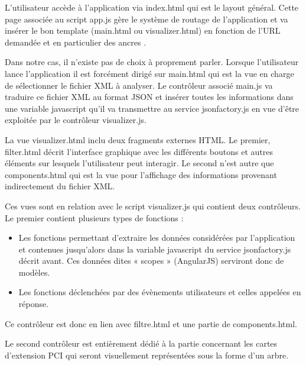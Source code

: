\documentclass [a4paper,11pt]{article}
\begin{document}
L’utilisateur accède à l’application via index.html qui est le layout général. Cette page associée au script app.js gère le système de routage de l’application et va insérer le bon template (main.html ou visualizer.html) en fonction de l’URL demandée et en particulier des ancres \cite{Landazuri16}.
\newline

Dans notre cas, il n’existe pas de choix à proprement parler. Lorsque l’utilisateur lance l’application il est forcément dirigé sur main.html qui est la vue en charge de sélectionner le fichier XML à analyser. Le contrôleur associé main.js va traduire ce fichier XML au format JSON et insérer toutes les informations dans une variable javascript qu’il va transmettre au service jsonfactory.js en vue d’être exploitée par le contrôleur visualizer.js.
\newline

La vue visualizer.html inclu deux fragments externes HTML. Le premier, filter.html décrit l’interface graphique avec les différents boutons et autres éléments sur lesquels l’utilisateur peut interagir. Le second n’est autre que components.html qui est la vue pour l’affichage des informations provenant indirectement du fichier XML.
\newline

Ces vues sont en relation avec le script visualizer.js qui contient deux contrôleurs. Le premier contient plusieurs types de fonctions :
\newline

\begin{itemize}
 \item Les fonctions permettant d’extraire les données considérées par l’application et contenues jusqu’alors dans la variable javascript du service jsonfactory.js décrit avant. Ces données dites « scopes » (AngularJS) serviront donc de modèles.
 \item Les fonctions déclenchées par des évènements utilisateurs et celles appelées en réponse.
 \newline
\end{itemize}

Ce contrôleur est donc en lien avec filtre.html et une partie de components.html.
\newline

Le second contrôleur est entièrement dédié à la partie concernant les cartes d’extension PCI qui seront visuellement représentées sous la forme d’un arbre.
\newline
\end{document}
